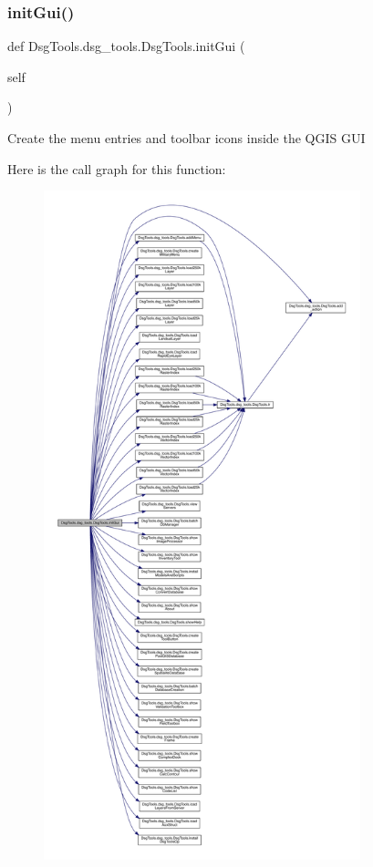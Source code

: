 \subsubsection{\texorpdfstring{init\+Gui()}{initGui()}}
{\footnotesize\ttfamily def Dsg\+Tools.\+dsg\+\_\+tools.\+Dsg\+Tools.\+init\+Gui (\begin{DoxyParamCaption}\item[{}]{self }\end{DoxyParamCaption})}

\begin{DoxyVerb}Create the menu entries and toolbar icons inside the QGIS GUI
\end{DoxyVerb}
 Here is the call graph for this function\+:
\nopagebreak
\begin{figure}[H]
\begin{center}
\leavevmode
\includegraphics[height=550pt]{class_dsg_tools_1_1dsg__tools_1_1_dsg_tools_ad85466220ae044da1b255a54b0943b59_cgraph}
\end{center}
\end{figure}
